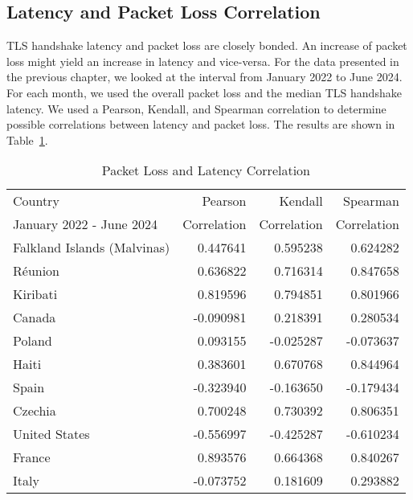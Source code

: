 \subsection{Latency and Packet Loss Correlation} \label{sec:latency-packetloss-correlation}

TLS handshake latency and packet loss are closely bonded. An increase of packet
loss might yield an increase in latency and vice-versa. For the data presented
in the previous chapter, we looked at the interval from January 2022 to June
2024. For each month, we used the overall packet loss and the median TLS
handshake latency. We used a Pearson, Kendall, and Spearman correlation to
determine possible correlations between latency and packet loss. The results
are shown in Table~\ref{fig:packetloss-latency-correlation}.

\begin{table}[ht]
	\footnotesize
	\caption{Packet Loss and Latency Correlation}
	\label{fig:packetloss-latency-correlation}
	\begin{tabular}{lrrr}
		\toprule
		Country                     & Pearson     & Kendall     & Spearman    \\
		January 2022 - June 2024    & Correlation & Correlation & Correlation \\
		\midrule
		Falkland Islands (Malvinas) & 0.447641    & 0.595238    & 0.624282    \\
		Réunion                     & 0.636822    & 0.716314    & 0.847658    \\
		Kiribati                    & 0.819596    & 0.794851    & 0.801966    \\
		Canada                      & -0.090981   & 0.218391    & 0.280534    \\
		Poland                      & 0.093155    & -0.025287   & -0.073637   \\
		Haiti                       & 0.383601    & 0.670768    & 0.844964    \\
		Spain                       & -0.323940   & -0.163650   & -0.179434   \\
		Czechia                     & 0.700248    & 0.730392    & 0.806351    \\
		United States               & -0.556997   & -0.425287   & -0.610234   \\
		France                      & 0.893576    & 0.664368    & 0.840267    \\
		Italy                       & -0.073752   & 0.181609    & 0.293882    \\

\end{tabular}
\end{table}
